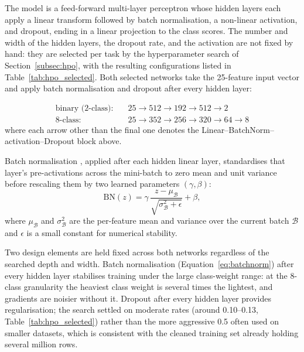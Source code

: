 \par The model is a feed-forward multi-layer perceptron whose hidden layers each apply a linear transform followed by batch normalisation, a non-linear activation, and dropout, ending in a linear projection to the class scores. The number and width of the hidden layers, the dropout rate, and the activation are not fixed by hand: they are selected per task by the hyperparameter search of Section~\ref{subsec:hpo}, with the resulting configurations listed in Table~\ref{tab:hpo_selected}. Both selected networks take the 25-feature input vector and apply batch normalisation and dropout after every hidden layer:

\begin{align*}
    \text{binary (2-class):}\quad & 25 \to 512 \to 192 \to 512 \to 2 \\
    \text{8-class:}\quad & 25 \to 352 \to 256 \to 320 \to 64 \to 8
\end{align*}
where each arrow other than the final one denotes the Linear--BatchNorm--activation--Dropout block above.

\par Batch normalisation \cite{Ioffe2015}, applied after each hidden linear layer, standardises that layer's pre-activations across the mini-batch to zero mean and unit variance before rescaling them by two learned parameters $(\gamma, \beta)$:
\begin{equation}
    \mathrm{BN}(z) = \gamma \, \frac{z - \mu_{\mathcal{B}}}{\sqrt{\sigma_{\mathcal{B}}^2 + \epsilon}} + \beta,
    \label{eq:batchnorm}
\end{equation}
where $\mu_{\mathcal{B}}$ and $\sigma_{\mathcal{B}}^2$ are the per-feature mean and variance over the current batch $\mathcal{B}$ and $\epsilon$ is a small constant for numerical stability.

\par Two design elements are held fixed across both networks regardless of the searched depth and width. Batch normalisation (Equation~\ref{eq:batchnorm}) after every hidden layer stabilises training under the large class-weight range: at the 8-class granularity the heaviest class weight is several times the lightest, and gradients are noisier without it. Dropout after every hidden layer provides regularisation; the search settled on moderate rates (around 0.10--0.13, Table~\ref{tab:hpo_selected}) rather than the more aggressive 0.5 often used on smaller datasets, which is consistent with the cleaned training set already holding several million rows.

